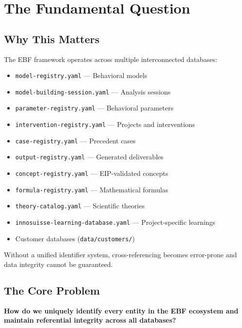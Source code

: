 \section{The Fundamental Question}
\label{sec:superkey-fundamental}

\subsection{Why This Matters}

The EBF framework operates across multiple interconnected databases:
\begin{itemize}
    \item \texttt{model-registry.yaml} --- Behavioral models
    \item \texttt{model-building-session.yaml} --- Analysis sessions
    \item \texttt{parameter-registry.yaml} --- Behavioral parameters
    \item \texttt{intervention-registry.yaml} --- Projects and interventions
    \item \texttt{case-registry.yaml} --- Precedent cases
    \item \texttt{output-registry.yaml} --- Generated deliverables
    \item \texttt{concept-registry.yaml} --- EIP-validated concepts
    \item \texttt{formula-registry.yaml} --- Mathematical formulas
    \item \texttt{theory-catalog.yaml} --- Scientific theories
    \item \texttt{innosuisse-learning-database.yaml} --- Project-specific learnings
    \item Customer databases (\texttt{data/customers/})
\end{itemize}

Without a unified identifier system, cross-referencing becomes error-prone
and data integrity cannot be guaranteed.

\subsection{The Core Problem}

\begin{tcolorbox}[colback=red!5!white, colframe=red!75!black,
    title=The Fundamental Question]
\textbf{How do we uniquely identify every entity in the EBF ecosystem
and maintain referential integrity across all databases?}
\end{tcolorbox}


